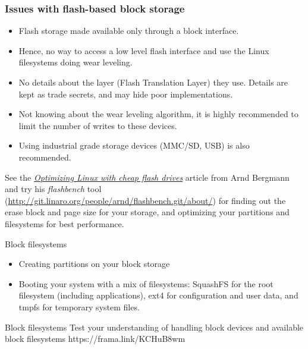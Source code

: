 \begin{frame}
  \frametitle{Issues with flash-based block storage}
  \begin{itemize}
  \item Flash storage made available only through a block interface.
  \item Hence, no way to access a low level flash interface
    and use the Linux filesystems doing wear leveling.
  \item No details about the layer (Flash Translation Layer) they
    use. Details are kept as trade secrets, and may hide poor
    implementations.
  \item Not knowing about the wear leveling algorithm, it is highly
    recommended to limit the number of writes to these devices.
  \item Using industrial grade storage devices (MMC/SD, USB) is
    also recommended.
  \end{itemize}
  See the \href{https://lwn.net/Articles/428584/}{\em Optimizing Linux with
  cheap flash drives} article from Arnd Bergmann and try his {\em
  flashbench} tool (\url{http://git.linaro.org/people/arnd/flashbench.git/about/})
  for finding out the erase block and page size for your storage, and
  optimizing your partitions and filesystems for best performance.
\end{frame}

\setuplabframe
{Block filesystems}
{
  \begin{itemize}
  \item Creating partitions on your block storage
  \item Booting your system with a mix of filesystems: SquashFS for
    the root filesystem (including applications), ext4 for
    configuration and user data, and tmpfs for
    temporary system files.
  \end{itemize}
}

\quizframe
{Block filesystems}
{Test your understanding of handling block devices and available block
filesystems}
{https://frama.link/KCHuB8wm}
